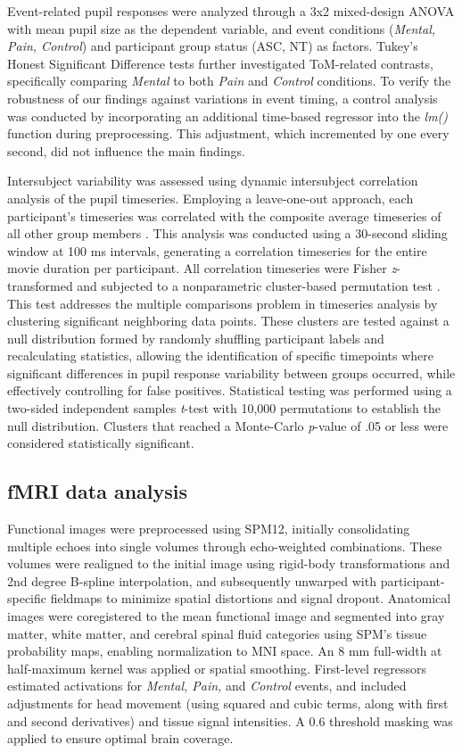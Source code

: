 Event-related pupil responses were analyzed through a 3x2 mixed-design ANOVA with mean pupil size as the dependent variable, and event conditions (\textit{Mental, Pain, Control}) and participant group status (ASC, NT) as factors. Tukey's Honest Significant Difference tests further investigated ToM-related contrasts, specifically comparing \textit{Mental} to both \textit{Pain} and \textit{Control} conditions. To verify the robustness of our findings against variations in event timing, a control analysis was conducted by incorporating an additional time-based regressor into the \textit{lm()} function during preprocessing. This adjustment, which incremented by one every second, did not influence the main findings.

Intersubject variability was assessed using dynamic intersubject correlation analysis of the pupil timeseries. Employing a leave-one-out approach, each participant's timeseries was correlated with the composite average timeseries of all other group members \citep{nastase2019}. This analysis was conducted using a 30-second sliding window at 100 ms intervals, generating a correlation timeseries for the entire movie duration per participant. All correlation timeseries were Fisher \textit{z}-transformed and subjected to a nonparametric cluster-based permutation test \citep{maris2007}. This test addresses the multiple comparisons problem in timeseries analysis by clustering significant neighboring data points. These clusters are tested against a null distribution formed by randomly shuffling participant labels and recalculating statistics, allowing the identification of specific timepoints where significant differences in pupil response variability between groups occurred, while effectively controlling for false positives. Statistical testing was performed using a two-sided independent samples \textit{t}-test with 10,000 permutations to establish the null distribution. Clusters that reached a Monte-Carlo \textit{p}-value of .05 or less were considered statistically significant.

\subsection*{fMRI data analysis}
Functional images were preprocessed using SPM12, initially consolidating multiple echoes into single volumes through echo-weighted combinations. These volumes were realigned to the initial image using rigid-body transformations and 2nd degree B-spline interpolation, and subsequently unwarped with participant-specific fieldmaps to minimize spatial distortions and signal dropout. Anatomical images were coregistered to the mean functional image and segmented into gray matter, white matter, and cerebral spinal fluid categories using SPM's tissue probability maps, enabling normalization to MNI space. An 8 mm full-width at half-maximum kernel was applied or spatial smoothing. First-level regressors estimated activations for \textit{Mental, Pain,} and \textit{Control} events, and included adjustments for head movement (using squared and cubic terms, along with first and second derivatives) and tissue signal intensities. A 0.6 threshold masking was applied to ensure optimal brain coverage.

